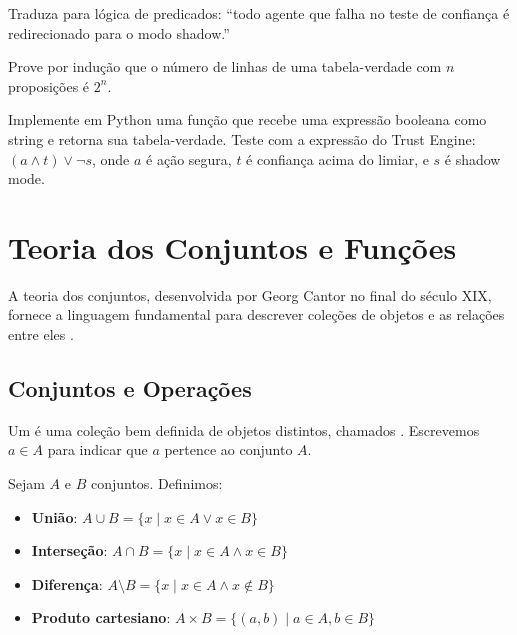\begin{exercicio}
    Traduza para lógica de predicados: ``todo agente que falha no teste de
    confiança é redirecionado para o modo shadow.''
\end{exercicio}

\begin{exercicio}
    Prove por indução que o número de linhas de uma tabela-verdade com $n$
    proposições é $2^n$.
\end{exercicio}

\begin{exercicio}
    Implemente em Python uma função que recebe uma expressão booleana como
    string e retorna sua tabela-verdade. Teste com a expressão do Trust
    Engine: $(a \land t) \lor \neg s$, onde $a$ é ação segura, $t$ é
    confiança acima do limiar, e $s$ é shadow mode.
\end{exercicio}

\section{Teoria dos Conjuntos e Funções}
\label{sec:teoria-conjuntos}
\nivelbasico

A teoria dos conjuntos, desenvolvida por Georg Cantor no final do século XIX,
fornece a linguagem fundamental para descrever coleções de objetos e as
relações entre eles \cite{hastie2009elements, wasserman2004all}.

\subsection{Conjuntos e Operações}

\begin{definicao}[Conjunto]
    Um  é uma coleção bem definida de objetos distintos,
    chamados . Escrevemos $a \in A$ para indicar que
    $a$ pertence ao conjunto $A$.
\end{definicao}

\begin{definicao}
    Sejam $A$ e $B$ conjuntos. Definimos:
    \begin{itemize}
        \item \textbf{União}: $A \cup B = \{x \mid x \in A \lor x \in B\}$
        \item \textbf{Interseção}: $A \cap B = \{x \mid x \in A \land x \in B\}$
        \item \textbf{Diferença}: $A \setminus B = \{x \mid x \in A \land x \notin B\}$
        \item \textbf{Produto cartesiano}: $A \times B = \{(a,b) \mid a \in A, b \in B\}$
    \end{itemize}
\end{definicao}

